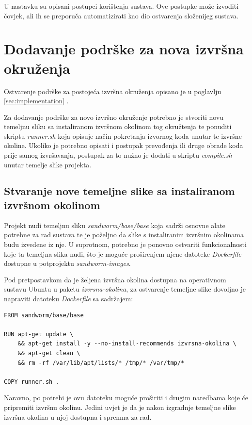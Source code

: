 \documentclass[times, utf8, zavrsni]{fer}
\begin{document}
{{{\begin{appendices}
U nastavku su opisani postupci korištenja sustava. Ove postupke može izvoditi čovjek, ali ih se preporuča automatizirati kao dio ostvarenja složenijeg sustava.

\section{Dodavanje podrške za nova izvršna okruženja}

Ostvarenje podrške za postojeća izvršna okruženja opisano je u poglavlju \ref{sec:implementation} .

Za dodavanje podrške za novo izvršno okruženje potrebno je stvoriti novu temeljnu sliku sa instaliranom izvršnom okolinom tog okružtenja te ponuditi skriptu {\textit{runner.sh}} koja opisuje način pokretanja izvornog koda unutar te izvršne okoline. Ukoliko je potrebno opisati i postupak prevođenja ili druge obrade koda prije samog izvršavanja, postupak za to nužno je dodati u skriptu {\textit{compile.sh}} unutar temelje slike projekta.

\subsection{Stvaranje nove temeljne slike sa instaliranom izvršnom okolinom}

Projekt nudi temeljnu sliku {\textit{sandworm/base/base}} koja sadrži osnovne alate potrebne za rad sustava te je poželjno da slike s instaliranim izvršnim okolinama budu izvedene iz nje. U suprotnom, potrebno je ponovno ostvariti funkcionalnosti koje ta temeljna slika nudi, što je moguće proširenjem njene datoteke {\textit{Dockerfile}} dostupne u potprojektu {\textit{sandworm-images}}.

Pod pretpostavkom da je željena izvršna okolina dostupna na operativnom sustavu Ubuntu u paketu {\textit{izvrsna-okolina}}, za ostvarenje temeljne slike dovoljno je napraviti datoteku {\textit{Dockerfile}} sa sadržajem:

\begin{lstlisting}
FROM sandworm/base/base

RUN apt-get update \
    && apt-get install -y --no-install-recommends izvrsna-okolina \
    && apt-get clean \
    && rm -rf /var/lib/apt/lists/* /tmp/* /var/tmp/*

COPY runner.sh .
\end{lstlisting}

Naravno, po potrebi je ovu datoteku moguće proširiti i drugim naredbama koje će pripremiti izvršnu okolinu. Jedini uvjet je da je nakon izgradnje temeljne slike izvršna okolina u njoj dostupna i spremna za rad.


\end{appendices}}}}
\end{document}
